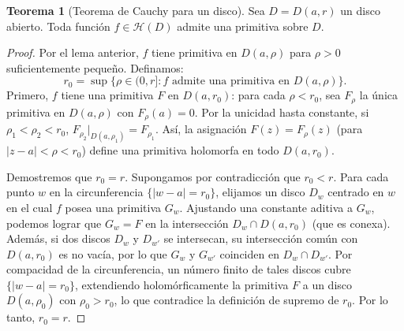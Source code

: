 \documentclass[11pt,a4paper]{article}
\theoremstyle{definition}
\newtheorem{teorema}{Teorema}[section]
\theoremstyle{remark}
\numberwithin{equation}{section}
\begin{document}
\begin{teorema}[Teorema de Cauchy para un disco]
Sea $D = D(a,r)$ un disco abierto. Toda función $f \in \mathcal{H}(D)$ admite una primitiva sobre $D$.
\end{teorema}
\begin{proof}
Por el lema anterior, $f$ tiene primitiva en $D(a,\rho)$ para $\rho > 0$ suficientemente pequeño. Definamos:
\[
r_0 = \sup\{\rho \in (0,r] : f \text{ admite una primitiva en } D(a,\rho)\}.
\]
Primero, $f$ tiene una primitiva $F$ en $D(a,r_0)$: para cada $\rho < r_0$, sea $F_\rho$ la única primitiva en $D(a,\rho)$ con $F_\rho(a) = 0$. Por la unicidad hasta constante, si $\rho_1 < \rho_2 < r_0$, $F_{\rho_2}|_{D(a,\rho_1)} = F_{\rho_1}$. Así, la asignación $F(z) = F_\rho(z)$ (para $|z-a| < \rho < r_0$) define una primitiva holomorfa en todo $D(a,r_0)$.

Demostremos que $r_0 = r$. Supongamos por contradicción que $r_0 < r$. Para cada punto $w$ en la circunferencia $\{|w-a|=r_0\}$, elijamos un disco $D_w$ centrado en $w$ en el cual $f$ posea una primitiva $G_w$. Ajustando una constante aditiva a $G_w$, podemos lograr que $G_w = F$ en la intersección $D_w \cap D(a,r_0)$ (que es conexa). Además, si dos discos $D_w$ y $D_{w'}$ se intersecan, su intersección común con $D(a,r_0)$ es no vacía, por lo que $G_w$ y $G_{w'}$ coinciden en $D_w \cap D_{w'}$. Por compacidad de la circunferencia, un número finito de tales discos cubre $\{|w-a|=r_0\}$, extendiendo holomórficamente la primitiva $F$ a un disco $D(a,\rho_0)$ con $\rho_0 > r_0$, lo que contradice la definición de supremo de $r_0$. Por lo tanto, $r_0 = r$.
\end{proof}
\end{document}
